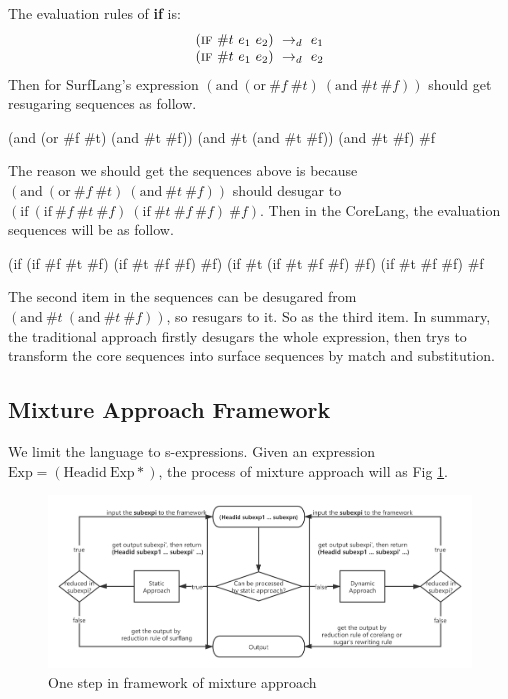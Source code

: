 The evaluation rules of {\bfseries if} is:
\[
\begin{array}{l}
(\mbox{\sc if}~\#t~e_1~e_2) ~\rightarrow_d~ e_1\\
(\mbox{\sc if}~\#t~e_1~e_2) ~\rightarrow_d~ e_2
\end{array}
\]
Then for SurfLang's expression $(\mbox{and}~(\mbox{or}~\#f~\#t)~(\mbox{and}~\#t~\#f))$ should get resugaring sequences as follow.

\begin{Codes}
    (and (or \#f \#t) (and \#t \#f))
\OneStep (and \#t (and \#t \#f))
\OneStep (and \#t \#f)
\OneStep \#f
\end{Codes}

The reason we should get the sequences above is because $(\mbox{and}~(\mbox{or}~\#f~\#t)~(\mbox{and}~\#t~\#f))$ should desugar to $(\mbox{if}~(\mbox{if}~\#f~\#t~\#f)~(\mbox{if}~\#t~\#f~\#f)~\#f)$. Then in the CoreLang, the evaluation sequences will be as follow.
\begin{Codes}
    (if (if \#f \#t \#f) (if \#t \#f \#f) \#f)
\OneStep (if \#t (if \#t \#f \#f) \#f)
\OneStep (if \#t \#f \#f)
\OneStep \#f
\end{Codes}

The second item in the sequences can be desugared from $(\mbox{and}~\#t~(\mbox{and}~\#t~\#f))$, so resugars to it. So as the third item. In summary, the traditional approach firstly desugars the whole expression, then trys to transform the core sequences into surface sequences by match and substitution.

\subsection{Mixture Approach Framework}
We limit the language to s-expressions. Given an expression $\mbox{Exp} = (\mbox{Headid}~\mbox{Exp}*)$, the process of mixture approach will as Fig \ref{fig:mixture}.

\begin{figure}[t]
	\centering
	\includegraphics[width=12cm]{images/mixture.png}
	\caption{One step in framework of mixture approach}
	\label{fig:mixture}
\end{figure}

